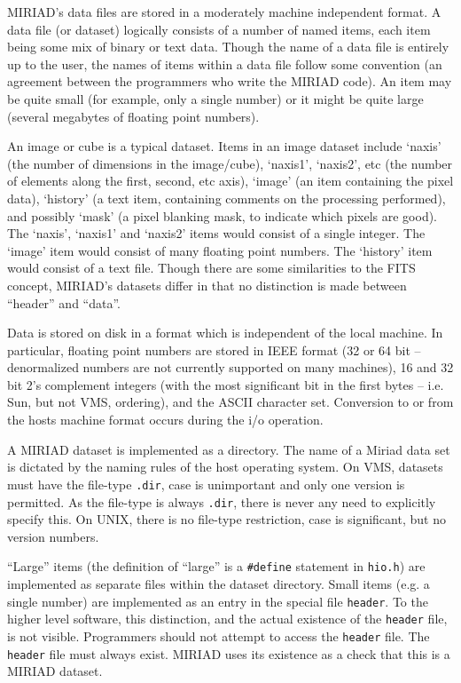 

MIRIAD's data files are stored in a moderately machine independent format.
A data file (or dataset) logically consists of a number of named items,
each item being
some mix of binary or text data. Though the name of a data file is
entirely up to the user, the names of items within a data file follow some
convention (an agreement between the programmers who write the MIRIAD code).
An item may be quite small (for example, only a single number)
or it might be quite large (several megabytes of floating point numbers).

An image or cube is a typical dataset. Items in an image dataset include
`naxis' (the number of dimensions in the image/cube), `naxis1', `naxis2', etc
(the number of elements along the first, second, etc axis), `image' (an
item containing the pixel data), `history' (a text item, containing comments
on the processing performed), and possibly `mask' (a pixel blanking mask, to
indicate which pixels are good). The `naxis', `naxis1' and `naxis2' items
would consist of a single integer. The `image' item would consist of many
floating point numbers. The `history' item would consist of a text file.
Though there are some similarities to the
FITS concept, MIRIAD's datasets differ in that no distinction is made
between ``header'' and ``data''.


Data is stored on disk in a format which is independent of the local
machine. In particular, floating point numbers are stored in IEEE format
(32 or 64 bit -- denormalized numbers are not currently supported on many
machines), 16 and 32 bit 2's complement integers
(with the most significant bit in the first bytes -- i.e. Sun, but not VMS,
ordering), and the ASCII character set. Conversion to or from the hosts
machine format occurs during the i/o operation.

A MIRIAD dataset is implemented as a directory. The name of a Miriad data
set is dictated by the naming rules of the host operating system. On
VMS, datasets must have the file-type {\tt .dir}, case is unimportant
and only one version is permitted. As the file-type is always
{\tt .dir}, there is never any need to explicitly specify this.
On UNIX, there is no file-type restriction, case is significant, but no
version numbers.

``Large'' items (the definition of ``large'' is a {\tt \#define} statement
in {\tt hio.h}) are implemented as separate files within the dataset
directory.  Small items (e.g. a single number) are implemented as an entry
in the special file {\tt header}. To the higher level software, this
distinction, and the actual existence of the {\tt header} file, is not
visible. Programmers should not attempt to access the {\tt header} file.
The {\tt header} file must always exist. MIRIAD uses its existence as a
check that this is a MIRIAD dataset.

